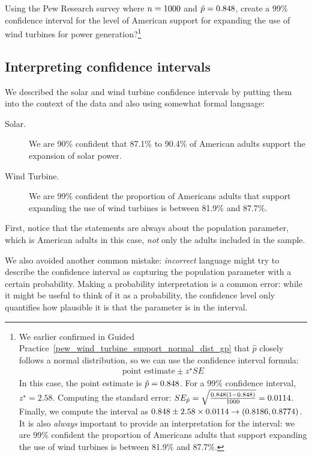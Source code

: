 \begin{exercise}
Using the Pew Research survey where $n = 1000{}$ and $\hat{p} = 0.848{}$, create a 99\% confidence interval for the level of American support for expanding the use of wind turbines for power generation?\footnote{We earlier confirmed in Guided Practice~\ref{pew_wind_turbine_support_normal_dist_gp} that $\hat{p}$ closely follows a normal distribution, so we can use the confidence interval formula:
\begin{align*}
\text{point estimate} \pm z^{\star} SE
\end{align*}
In this case, the point estimate is $\hat{p} = 0.848{}$. For a 99\% confidence interval, $z^{\star} = 2.58$. Computing the standard error: $SE_{\hat{p}} = \sqrt{\frac{0.848{}(1 - 0.848{})}{1000{}}} = 0.0114{}$. Finally, we compute the interval as $0.848{} \pm 2.58 \times 0.0114{} \to (0.8186, 0.8774)$. It is also \emph{always} important to provide an interpretation for the interval:
we are 99\% confident the proportion of
Americans adults that support expanding the use of wind
turbines is between 81.9\% and 87.7\%.}
\end{exercise}


\subsection{Interpreting confidence intervals}
\label{interpretingCIs}


We described the solar and wind turbine confidence
intervals by putting them into the context of the data and also
using somewhat formal language:
\begin{description}
  \item[Solar.] We are 90\% confident that 87.1\% to 90.4\% of
      American adults support the expansion of solar power.
  \item[Wind Turbine.] We are 99\% confident the proportion of
      Americans adults that support expanding the use of wind
      turbines is between 81.9\% and 87.7\%.
\end{description}
First, notice that the statements are always about the population
parameter, which is American adults in this case, \emph{not} only
the adults included in the sample.

We also avoided another common mistake:
\emph{incorrect} language might try to describe the confidence interval
as capturing the population parameter with a certain probability.
Making a probability interpretation is a common error:
while it might be useful to think of it as a probability,
the confidence level only quantifies how plausible
it is that the parameter is in the interval.

